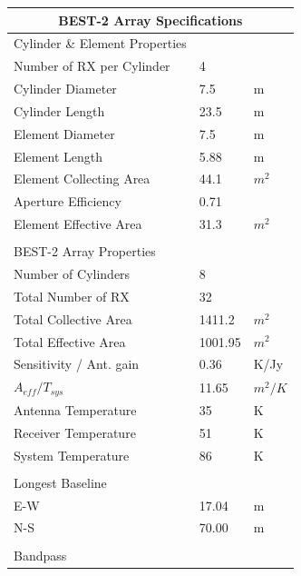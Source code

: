 \documentclass[useAMS,macros,usenatbib,onecolumn]{mn2e}
\begin{document}
\begin{table}
\begin{center}
\begin{tabular}{| l | l | l |}
\hline
\multicolumn{3}{|c|}{BEST-2 Array Specifications}\\
\hline
Cylinder \& Element Properties & &\\
\hline
Number of RX per Cylinder 	&          4 &            	\\
Cylinder Diameter 		&        7.5 &          m 	\\
Cylinder Length 		&       23.5 &          m 	\\
Element Diameter 		&        7.5 &          m 	\\
Element Length 			&       5.88 &          m 	\\
Element Collecting Area 	&       44.1 &        $m^2$ 	\\
Aperture Efficiency 		&       0.71 &            	\\
Element Effective Area 		&       31.3 &        $m^2$ 	\\
				&            &            	\\
\hline
BEST-2 Array Properties		&            &            	\\
\hline
Number of Cylinders 		&          8 &            	\\
Total Number of RX 		&         32 &            	\\
Total Collective Area 		&     1411.2 &        $m^2$ 	\\
Total Effective Area 		&    1001.95 &        $m^2$ 	\\
Sensitivity / Ant. gain 	&       0.36 &       K/Jy 	\\
$A_{eff}/T_{sys}$ 		&      11.65 &      $m^2/K$ 	\\
Antenna Temperature 		&         35 &          K 	\\
Receiver Temperature 		&         51 &          K 	\\
System Temperature  		&         86 &          K 	\\
				&            &            	\\
\hline
Longest Baseline 		&            &            	\\
\hline
E-W 				&      17.04 &         m 	\\
N-S 				&      70.00 &         m 	\\
				&            &            	\\
\hline
Bandpass        		&            &       		\\

\end{tabular}
\end{center}
\end{table}
\end{document}
